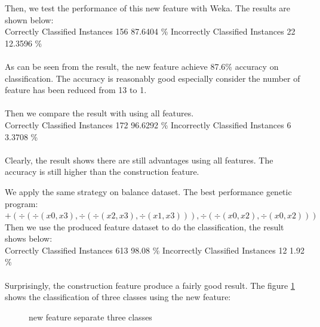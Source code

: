 \documentclass[11pt, a4paper, oneside, openright]{article}
\begin{document}
Then, we test the performance of this new feature with Weka.
The results are shown below:
\\
\newline Correctly Classified Instances   \hspace * {4mm}      156     \hspace * {4mm}           87.6404 \%
\newline Incorrectly Classified Instances   \hspace * {4mm}      22     \hspace * {4mm}           12.3596 \%
\\
\\
As can be seen from the result, the new feature achieve 87.6\% accuracy on classification. The accuracy is reasonably good especially consider the number of feature has been reduced from 13 to 1.
\\
\\
Then we compare the result with using all features.
\\
\newline Correctly Classified Instances   \hspace * {4mm}      172    \hspace * {4mm}           96.6292 \%
\newline Incorrectly Classified Instances   \hspace * {4mm}      6     \hspace * {4mm}           3.3708 \%
\\
\\
\newline Clearly, the result shows there are still advantages using all features. The accuracy is still higher than the construction feature.

We apply the same strategy on balance dataset.
The best performance genetic program:
\newline \hspace * {2.5cm} $+(\div ( \div (x0, x3), \div( \div (x2, x3), \div (x1, x3))), \div ( \div (x0, x2), \div (x0, x2)))$
\newline Then we use the produced feature dataset to do the classification, the result shows below:
\\
\newline Correctly Classified Instances      \hspace * {4mm}   613      \hspace * {4mm}         98.08   \%
\newline Incorrectly Classified Instances  \hspace * {4mm}      12       \hspace * {4mm}         1.92   \%
\\
\\
Surprisingly, the construction feature produce a fairly good result.
The figure \ref{fig:classes_2} shows the classification of three classes using the new feature:

  \begin{figure}[!ht]
  \centerline{}
  \caption{new feature separate three classes}
  \label{fig:classes_2}
  \end{figure}
\end{document}
